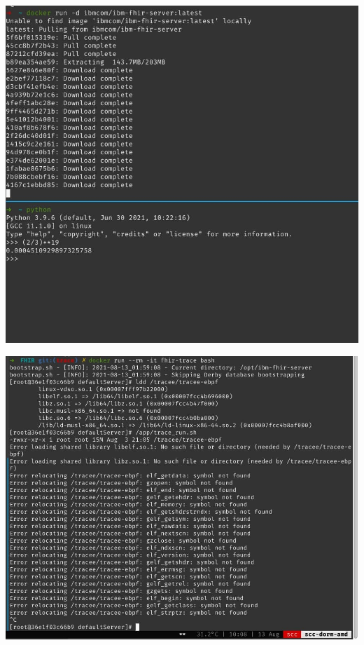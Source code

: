 \documentclass{beamer}
\begin{document}
\begin{CJK*}{UTF8}{bsmi}
  \begin{frame}
    \includegraphics[width=\textwidth]{photo_2021-08-13_07-00-50.jpg}
  \end{frame}

  \begin{frame}
    \includegraphics[width=\textwidth]{photo_2021-08-13_10-12-53.jpg}
  \end{frame}


\end{CJK*}
\end{document}
